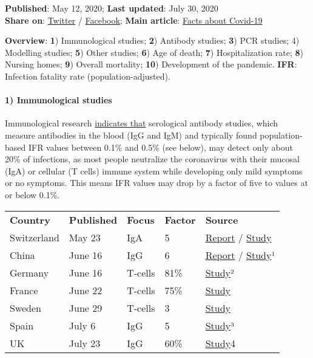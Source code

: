 \textbf{Published}: May 12, 2020; \textbf{Last updated}: July 30, 2020\\
\textbf{Share on}:
\href{https://twitter.com/intent/tweet?url=https://swprs.org/studies-on-covid-19-lethality/}{Twitter}
/
\href{https://www.facebook.com/share.php?u=https://swprs.org/studies-on-covid-19-lethality/}{Facebook};
\textbf{Main article}:
\href{https://swprs.org/a-swiss-doctor-on-covid-19/}{Facts about
Covid-19}

\textbf{Overview}: \textbf{1}) Immunological studies; \textbf{2})
Antibody studies; \textbf{3}) PCR studies; 4) Modelling studies;
\textbf{5}) Other studies; \textbf{6}) Age of death; \textbf{7})
Hospitalization rate; \textbf{8}) Nursing homes; \textbf{9}) Overall
mortality; \textbf{10}) Development of the pandemic. \textbf{IFR}:
Infection fatality rate (population-adjusted).

\hypertarget{1-immunological-studies}{%
\paragraph{1) Immunological studies}\label{1-immunological-studies}}

Immunological research
\href{https://swprs.org/coronavirus-antibody-tests-show-only-one-fifth-of-infections/}{indicates
that} serological antibody studies, which measure antibodies in the
blood (IgG and IgM) and typically found population-based IFR values
between 0.1\% and 0.5\% (see below), may detect only about 20\% of
infections, as most people neutralize the coronavirus with their mucosal
(IgA) or cellular (T cells) immune system while developing only mild
symptoms or no symptoms. This means IFR values may drop by a factor of
five to values at or below 0.1\%.

\begin{longtable}[]{@{}lllll@{}}
\toprule
\endhead
\textbf{Country} & \textbf{Published} & \textbf{Focus} & \textbf{Factor}
& \textbf{Source}\tabularnewline
Switzerland & May 23 & IgA & 5 &
\href{https://swprs.org/coronavirus-antibody-tests-show-only-one-fifth-of-infections/}{Report}
/
\href{https://www.biorxiv.org/content/10.1101/2020.05.21.108308v1}{Study}\tabularnewline
China & June 16 & IgG & 6 &
\href{https://www.scmp.com/news/china/science/article/3089476/there-may-be-no-immunity-against-covid-19-new-wuhan-study}{Report}
/
\href{https://www.medrxiv.org/content/10.1101/2020.06.13.20130252v1}{Study}¹\tabularnewline
Germany & June 16 & T-cells & 81\% &
\href{https://www.researchsquare.com/article/rs-35331/v1}{Study}²\tabularnewline
France & June 22 & T-cells & 75\% &
\href{https://www.medrxiv.org/content/10.1101/2020.06.21.20132449v1}{Study}\tabularnewline
Sweden & June 29 & T-cells & 3 &
\href{https://news.ki.se/immunity-to-covid-19-is-probably-higher-than-tests-have-shown}{Study}\tabularnewline
Spain & July 6 & IgG & 5 &
\href{https://www.thelancet.com/journals/lancet/article/PIIS0140-6736(20)31483-5/fulltext}{Study}³\tabularnewline
UK & July 23 & IgG & 60\% &
\href{https://www.biorxiv.org/content/10.1101/2020.05.14.095414v2}{Study}4\tabularnewline
\bottomrule
\end{longtable}

